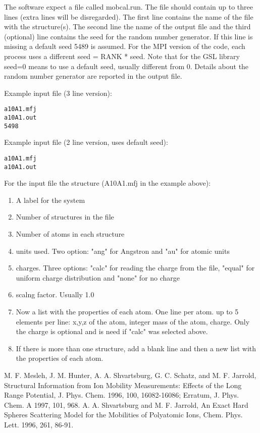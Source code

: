 \documentclass[letter,12pt]{article}
\begin{document}
The software expect a file called mobcal.run. The file should contain up to three lines (extra lines will be disregarded). 
The first line contains the name of the file with the structure(s). The second line the name of the output file and 
the third (optional) line contains the seed for the random number generator. If this line is missing a default seed 5489 is assumed.
For the MPI version of the code, each process uses a different seed = RANK * seed. Note that for the GSL library seed=0 means to use a default seed, usually different from 0.
Details about the random number generator are reported in the output file. 

Example input file (3 line version):
\begin{verbatim}
a10A1.mfj
a10A1.out
5498
\end{verbatim}

Example input file (2 line version, uses default seed):
\begin{verbatim}
a10A1.mfj
a10A1.out
\end{verbatim}

For the input file the structure (A10A1.mfj in the example above):
\begin{enumerate}
    \item A label for the system
    \item Number of structures in the file
    \item Number of atoms in each structure
    \item units used. Two option: "ang" for Angstron and "au" for atomic units
    \item charges. Three options: "calc" for reading the charge from the file, "equal" for uniform charge distribution and "none" for no charge
    \item scalng factor. Usually 1.0
    \item Now a list with the properties of each atom. One line per atom. up to 5 elements per line: x,y,z of the atom, integer mass of the atom, charge. Only the charge is optional and is need if "calc" was selected above.
    \item If there is more than one structure, add a blank line and then a new list with the properties of each atom.
\end{enumerate}


\begin{thebibliography}{99}
     M. F. Mesleh, J. M. Hunter, A. A. Shvartsburg, G. C. Schatz, and M. F. Jarrold, 
     Structural Information from Ion Mobility Measurements: Effects of the Long Range Potential, 
     J. Phys. Chem. 1996, 100, 16082-16086; 
     Erratum, J. Phys. Chem. A 1997, 101, 968.
     A. A. Shvartsburg and M. F. Jarrold, 
     An Exact Hard Spheres Scattering Model for the Mobilities of Polyatomic Ions, 
     Chem. Phys. Lett. 1996, 261, 86-91.
\end{thebibliography}
\end{document}
